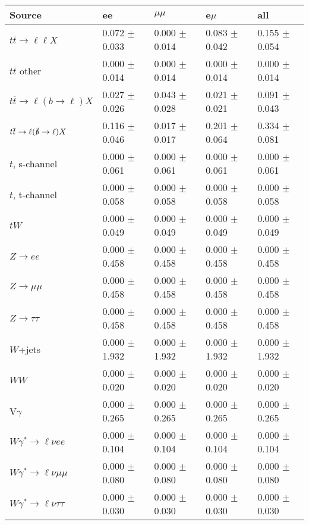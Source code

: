 \begin{tabular}{l | l l l l}
\hline\hline
 Source  &  ee  &  $\mu\mu$  &  e$\mu$  &  all \\
\hline
$t\overline{t}\rightarrow \ell\ell X$ &  0.072 $\pm$  0.033 &  0.000 $\pm$  0.014 &  0.083 $\pm$  0.042 &  0.155 $\pm$  0.054\\
$t\overline{t}$ other &  0.000 $\pm$  0.014 &  0.000 $\pm$  0.014 &  0.000 $\pm$  0.014 &  0.000 $\pm$  0.014\\
$t\overline{t}\rightarrow \ell(b\rightarrow \ell)X$ &  0.027 $\pm$  0.026 &  0.043 $\pm$  0.028 &  0.021 $\pm$  0.021 &  0.091 $\pm$  0.043\\
$t\overline{t}\rightarrow \ell(\slashed{b}\rightarrow \ell)X$ &  0.116 $\pm$  0.046 &  0.017 $\pm$  0.017 &  0.201 $\pm$  0.064 &  0.334 $\pm$  0.081\\
\hline
$t$, s-channel &  0.000 $\pm$  0.061 &  0.000 $\pm$  0.061 &  0.000 $\pm$  0.061 &  0.000 $\pm$  0.061\\
$t$, t-channel &  0.000 $\pm$  0.058 &  0.000 $\pm$  0.058 &  0.000 $\pm$  0.058 &  0.000 $\pm$  0.058\\
$tW$ &  0.000 $\pm$  0.049 &  0.000 $\pm$  0.049 &  0.000 $\pm$  0.049 &  0.000 $\pm$  0.049\\
\hline
$Z\rightarrow ee$ &  0.000 $\pm$  0.458 &  0.000 $\pm$  0.458 &  0.000 $\pm$  0.458 &  0.000 $\pm$  0.458\\
$Z\rightarrow\mu\mu$ &  0.000 $\pm$  0.458 &  0.000 $\pm$  0.458 &  0.000 $\pm$  0.458 &  0.000 $\pm$  0.458\\
$Z\rightarrow\tau\tau$ &  0.000 $\pm$  0.458 &  0.000 $\pm$  0.458 &  0.000 $\pm$  0.458 &  0.000 $\pm$  0.458\\
$W$+jets &  0.000 $\pm$  1.932 &  0.000 $\pm$  1.932 &  0.000 $\pm$  1.932 &  0.000 $\pm$  1.932\\
$WW$ &  0.000 $\pm$  0.020 &  0.000 $\pm$  0.020 &  0.000 $\pm$  0.020 &  0.000 $\pm$  0.020\\
\hline
V$\gamma$ &  0.000 $\pm$  0.265 &  0.000 $\pm$  0.265 &  0.000 $\pm$  0.265 &  0.000 $\pm$  0.265\\
$W\gamma^{*}\rightarrow\ell\nu e e$ &  0.000 $\pm$  0.104 &  0.000 $\pm$  0.104 &  0.000 $\pm$  0.104 &  0.000 $\pm$  0.104\\
$W\gamma^{*}\rightarrow\ell\nu\mu\mu$ &  0.000 $\pm$  0.080 &  0.000 $\pm$  0.080 &  0.000 $\pm$  0.080 &  0.000 $\pm$  0.080\\
$W\gamma^{*}\rightarrow\ell\nu\tau\tau$ &  0.000 $\pm$  0.030 &  0.000 $\pm$  0.030 &  0.000 $\pm$  0.030 &  0.000 $\pm$  0.030\\

\end{tabular}
